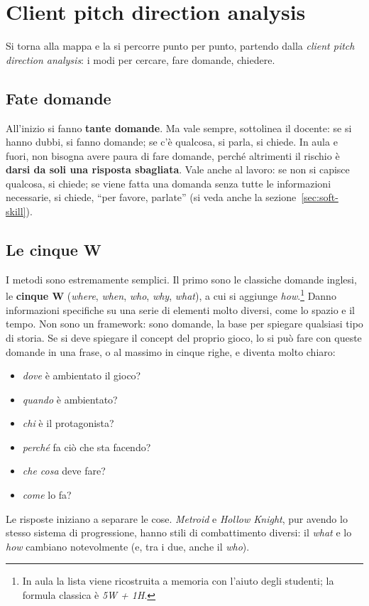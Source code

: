 \section{Client pitch direction analysis}
\label{sec:client-pitch}



Si torna alla mappa e la si percorre punto per punto, partendo dalla
\emph{client pitch direction analysis}: i modi per cercare, fare domande,
chiedere.

\subsection{Fate domande}

All'inizio si fanno \textbf{tante domande}. Ma vale sempre, sottolinea il
docente: se si hanno dubbi, si fanno domande; se c'è qualcosa, si parla, si
chiede. In aula e fuori, non bisogna avere paura di fare domande, perché
altrimenti il rischio è \textbf{darsi da soli una risposta sbagliata}. Vale
anche al lavoro: se non si capisce qualcosa, si chiede; se viene fatta una
domanda senza tutte le informazioni necessarie, si chiede, ``per favore,
parlate'' (si veda anche la sezione~\ref{sec:soft-skill}).

\subsection{Le cinque W}

I metodi sono estremamente semplici. Il primo sono le classiche domande
inglesi, le \textbf{cinque W} (\emph{where}, \emph{when}, \emph{who},
\emph{why}, \emph{what}), a cui si aggiunge \emph{how}.\footnote{In aula la
lista viene ricostruita a memoria con l'aiuto degli studenti; la formula
classica è \emph{5W + 1H}.} Danno informazioni specifiche su una serie di
elementi molto diversi, come lo spazio e il tempo. Non sono un framework: sono
domande, la base per spiegare qualsiasi tipo di storia. Se si deve spiegare il
concept del proprio gioco, lo si può fare con queste domande in una frase, o
al massimo in cinque righe, e diventa molto chiaro:
\begin{itemize}
  \item \emph{dove} è ambientato il gioco?
  \item \emph{quando} è ambientato?
  \item \emph{chi} è il protagonista?
  \item \emph{perché} fa ciò che sta facendo?
  \item \emph{che cosa} deve fare?
  \item \emph{come} lo fa?
\end{itemize}
Le risposte iniziano a separare le cose. \emph{Metroid} e \emph{Hollow
Knight}, pur avendo lo stesso sistema di progressione, hanno stili di
combattimento diversi: il \emph{what} e lo \emph{how} cambiano notevolmente
(e, tra i due, anche il \emph{who}).


